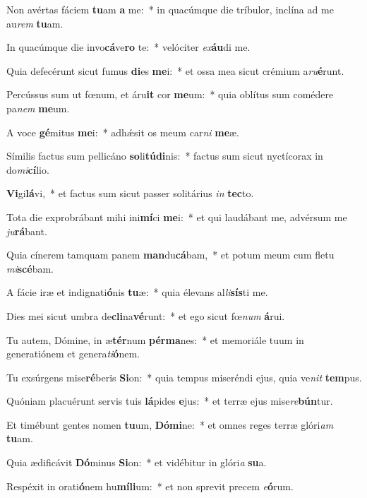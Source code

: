 \item Non avértas fáciem \textbf{tu}am \textbf{a} me:~* in quacúmque die tríbulor, inclína ad me au\textit{rem} \textbf{tu}am.
\item In quacúmque die invo\textbf{cá}ve\textbf{ro} te:~* velóciter \textit{ex}\textbf{áu}di me.
\item Quia defecérunt sicut fumus \textbf{di}es \textbf{me}i:~* et ossa mea sicut crémium a\textit{ru}\textbf{é}runt.
\item Percússus sum ut fœnum, et áru\textbf{it} cor \textbf{me}um:~* quia oblítus sum comédere pa\textit{nem} \textbf{me}um.
\item A voce \textbf{gé}mitus \textbf{me}i:~* adhǽsit os meum car\textit{ni} \textbf{me}æ.
\item Símilis factus sum pellicáno \textbf{so}li\textbf{tú}\textbf{di}nis:~* factus sum sicut nyctícorax in do\textit{mi}\textbf{cí}lio.
\item \textbf{Vi}gi\textbf{lá}vi,~* et factus sum sicut passer solitárius \textit{in} \textbf{tec}to.
\item Tota die exprobrábant mihi ini\textbf{mí}ci \textbf{me}i:~* et qui laudábant me, advérsum me \textit{ju}\textbf{rá}bant.
\item Quia cínerem tamquam panem \textbf{man}du\textbf{cá}bam,~* et potum meum cum fletu \textit{mi}\textbf{scé}bam.
\item A fácie iræ et indignati\textbf{ó}nis \textbf{tu}æ:~* quia élevans al\textit{li}\textbf{sís}ti me.
\item Dies mei sicut umbra de\textbf{cli}na\textbf{vé}runt:~* et ego sicut fœ\textit{num} \textbf{á}rui.
\item Tu autem, Dómine, in æ\textbf{tér}num \textbf{pér}\textbf{ma}nes:~* et memoriále tuum in generatiónem et genera\textit{ti}\textbf{ó}nem.
\item Tu exsúrgens mise\textbf{ré}beris \textbf{Si}on:~* quia tempus miseréndi ejus, quia ve\textit{nit} \textbf{tem}pus.
\item Quóniam placuérunt servis tuis \textbf{lá}pides \textbf{e}jus:~* et terræ ejus mise\textit{re}\textbf{bún}tur.
\item Et timébunt gentes nomen \textbf{tu}um, \textbf{Dó}\textbf{mi}ne:~* et omnes reges terræ glóri\textit{am} \textbf{tu}am.
\item Quia ædificávit \textbf{Dó}minus \textbf{Si}on:~* et vidébitur in glóri\textit{a} \textbf{su}a.
\item Respéxit in orati\textbf{ó}nem hu\textbf{mí}\textbf{li}um:~* et non sprevit precem \textit{e}\textbf{ó}rum.
